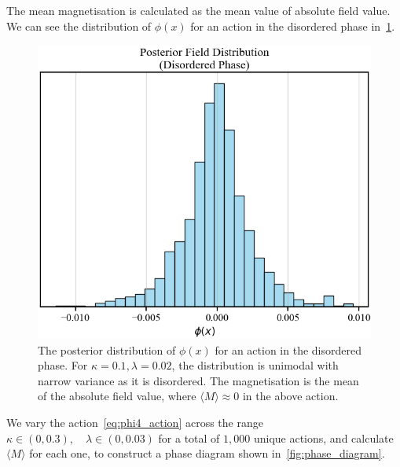\documentclass[11pt]{article}
\begin{document}
    The mean magnetisation is calculated as the mean value of absolute field value.
    We can see the distribution of $\phi(x)$ for an action in the disordered phase in~\cref{fig:magnetisation}.
\begin{figure}[h!]
    \center
    \includegraphics[width=\linewidth]{../figures/Magnetisation}
    \caption{
        The posterior distribution of $\phi(x)$ for an action in the disordered phase.
        For $\kappa = 0.1, \lambda = 0.02$, the distribution is unimodal with narrow variance as it is disordered.
        The magnetisation is the mean of the absolute field value, where $\langle M \rangle \approx 0$ in the above
        action.
    }\label{fig:magnetisation}
    \end{figure}

    We vary the action~\eqref{eq:phi4_action} across the range $\kappa \in (0, 0.3), \quad \lambda \in (0, 0.03)$ for
    a total of $1,000$ unique actions, and calculate $\langle M \rangle$ for each one, to construct a phase diagram
    shown in~\cref{fig:phase_diagram}.
\end{document}
